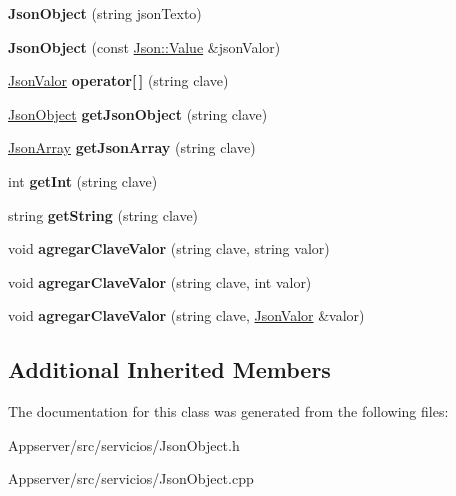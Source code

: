 \begin{DoxyCompactItemize}
\item 
{\bfseries Json\+Object} (string json\+Texto)\hypertarget{classJsonObject_a37c52e97d2b4187171f5226bb11ddbf6}{}\label{classJsonObject_a37c52e97d2b4187171f5226bb11ddbf6}

\item 
{\bfseries Json\+Object} (const \hyperlink{classJson_1_1Value}{Json\+::\+Value} \&json\+Valor)\hypertarget{classJsonObject_abe2ab40281a208a16983a8c9e950a4a7}{}\label{classJsonObject_abe2ab40281a208a16983a8c9e950a4a7}

\item 
\hyperlink{classJsonValor}{Json\+Valor} {\bfseries operator\mbox{[}$\,$\mbox{]}} (string clave)\hypertarget{classJsonObject_a8f37b0bd7a2de2c0c2e0ee5a43d794b3}{}\label{classJsonObject_a8f37b0bd7a2de2c0c2e0ee5a43d794b3}

\item 
\hyperlink{classJsonObject}{Json\+Object} {\bfseries get\+Json\+Object} (string clave)\hypertarget{classJsonObject_a268075faf3d74db5ffd26d6aa13611fd}{}\label{classJsonObject_a268075faf3d74db5ffd26d6aa13611fd}

\item 
\hyperlink{classJsonArray}{Json\+Array} {\bfseries get\+Json\+Array} (string clave)\hypertarget{classJsonObject_a9a52a2f313f93bf923adfadff451831e}{}\label{classJsonObject_a9a52a2f313f93bf923adfadff451831e}

\item 
int {\bfseries get\+Int} (string clave)\hypertarget{classJsonObject_abfcf9120de35a4977c278e5b9136b584}{}\label{classJsonObject_abfcf9120de35a4977c278e5b9136b584}

\item 
string {\bfseries get\+String} (string clave)\hypertarget{classJsonObject_aaacd804f6b16d215c8b942fb02e22a7e}{}\label{classJsonObject_aaacd804f6b16d215c8b942fb02e22a7e}

\item 
void {\bfseries agregar\+Clave\+Valor} (string clave, string valor)\hypertarget{classJsonObject_a6e4d553543a3dbfd75d09c1ab449b025}{}\label{classJsonObject_a6e4d553543a3dbfd75d09c1ab449b025}

\item 
void {\bfseries agregar\+Clave\+Valor} (string clave, int valor)\hypertarget{classJsonObject_ab77f4672fdc67815e5b89bb83c6bc937}{}\label{classJsonObject_ab77f4672fdc67815e5b89bb83c6bc937}

\item 
void {\bfseries agregar\+Clave\+Valor} (string clave, \hyperlink{classJsonValor}{Json\+Valor} \&valor)\hypertarget{classJsonObject_a47d0887639448348e4c750f1cbcea254}{}\label{classJsonObject_a47d0887639448348e4c750f1cbcea254}

\end{DoxyCompactItemize}
\subsection*{Additional Inherited Members}


The documentation for this class was generated from the following files\+:\begin{DoxyCompactItemize}
\item 
Appserver/src/servicios/Json\+Object.\+h\item 
Appserver/src/servicios/Json\+Object.\+cpp\end{DoxyCompactItemize}
